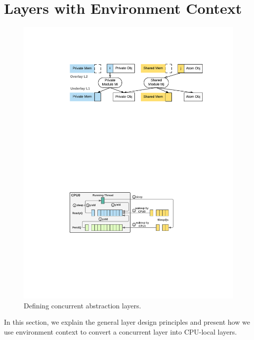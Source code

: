 \vspace{-5pt}
\section{Layers with Environment Context}
\label{sec:machine}


\begin{figure}
\begin{center}
\includegraphics[scale=0.55]{figs/build_object}
\vspace*{-8pt}	
\end{center}
\caption{Defining concurrent abstraction layers.}
\label{fig:spec:object}
\vspace*{-10pt}
\end{figure}


In this section, we explain the general layer design principles and present
how we use environment context to convert a concurrent layer into 
 CPU-local layers.

